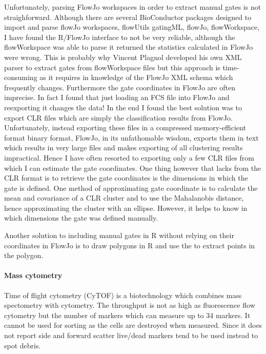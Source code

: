 Unfortunately, parsing FlowJo workspaces in order to extract manual gates is not straighforward.
Although there are several BioConductor packages designed to import and parse flowJo workspaces, flowUtils gatingML, flowJo, flowWorkspace,
I have found the R/FlowJo interface to not be very reliable, although the flowWorkspace was able to parse it returned the statistics calculated in FlowJo were wrong.
This is probably why Vincent Plagnol developed his own XML parser to extract gates from flowWorkspace files but this approach is time-consuming as it requires in knowledge of the FlowJo XML schema which frequently changes.
Furthermore the gate coordinates in FlowJo are often imprecise.
In fact I found that just loading an FCS file into FlowJo and reexporting it changes the data!
In the end I found the best solution was to export CLR files which are simply the classification results from FlowJo.
Unfortunately, instead exporting these files in a compressed memory-efficient format binary format, FlowJo, in its unfathomable wisdom, exports them in text which results in very large files and makes exporting of all clustering results impractical.
Hence I have often resorted to exporting only a few CLR files from which I can estimate the gate coordinates.
One thing however that lacks from the CLR format is to retrieve the gate coordinates is the dimensions in which the gate is defined.
One method of approximating gate coordinate is to calculate the mean and covariance of a CLR cluster and to use the Mahalanobis distance,
hence approximating the cluster with an ellipse.
However, it helps to know in which dimensions the gate was defined manually.

Another solution to including manual gates in R without relying on their coordinates in FlowJo
is to draw polygons in R and use the  to extract points in the polygon.

\paragraph{Mass cytometry}

Time of flight cytometry (CyTOF) is a biotechnology which combines mass spectometry with cytometry.
The throughput is not as high as fluorescence flow cytometry but the number of markers which can measure up to 34 markers.
It cannot be used for sorting as the cells are destroyed when measured.
Since it does not report side and forward scatter live/dead markers tend to be used instead to spot debris.


